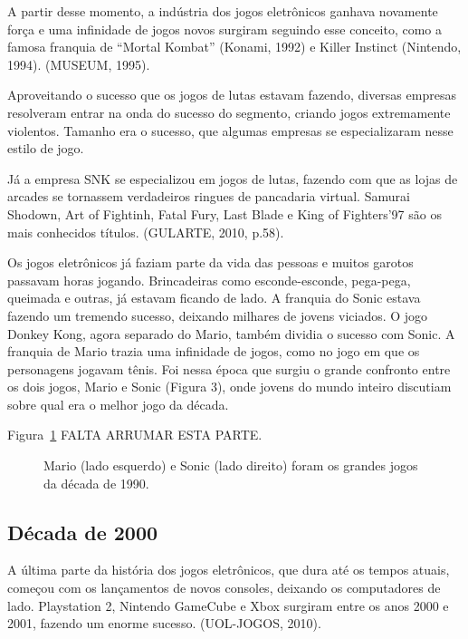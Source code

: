 A partir desse momento, a indústria dos jogos eletrônicos ganhava novamente força e uma infinidade de jogos novos surgiram seguindo esse conceito, como a famosa franquia de “Mortal Kombat” (Konami, 1992) e Killer Instinct (Nintendo, 1994). (MUSEUM, 1995). 

Aproveitando o sucesso que os jogos de lutas estavam fazendo, diversas empresas resolveram entrar na onda do sucesso do segmento, criando jogos extremamente violentos. Tamanho era o sucesso, que algumas empresas se especializaram nesse estilo de jogo.

\begin{citacao}
Já a empresa SNK se especializou em jogos de lutas, fazendo com que as lojas de arcades se tornassem verdadeiros ringues de pancadaria virtual. Samurai Shodown, Art of Fightinh, Fatal Fury, Last Blade e King of Fighters’97 são os mais conhecidos títulos. (GULARTE, 2010, p.58).
\end{citacao}

Os jogos eletrônicos já faziam parte da vida das pessoas e muitos garotos passavam horas jogando. Brincadeiras como esconde-esconde, pega-pega, queimada e outras, já estavam ficando de lado. A franquia do Sonic estava fazendo um tremendo sucesso, deixando milhares de jovens viciados. O jogo Donkey Kong, agora separado do Mario, também dividia o sucesso com Sonic. A franquia de Mario trazia uma infinidade de jogos, como no jogo em que os personagens jogavam tênis. Foi nessa época que surgiu o grande confronto entre os dois jogos, Mario e Sonic (Figura 3), onde jovens do mundo inteiro discutiam sobre qual era o melhor jogo da década.

Figura~\ref{f1.3} FALTA ARRUMAR ESTA PARTE.
\begin{figure}[!hbp]
\makebox[\textwidth]{\framebox[5cm]{\rule{0pt}{5cm}}}
\caption{Mario (lado esquerdo) e Sonic (lado direito) foram os grandes jogos da década de 1990.} \label{f1.3}
\end{figure}

\subsection{Década de 2000}

A última parte da história dos jogos eletrônicos, que dura até os tempos atuais, começou com os lançamentos de novos consoles, deixando os computadores de lado. Playstation 2, Nintendo GameCube e Xbox surgiram entre os anos 2000 e 2001, fazendo um enorme sucesso. (UOL-JOGOS, 2010).

